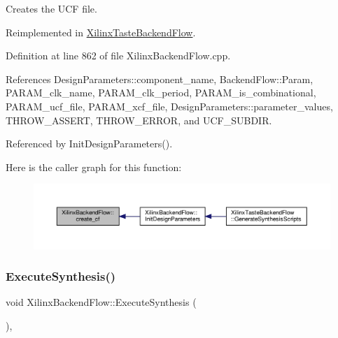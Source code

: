 Creates the U\+CF file. 



Reimplemented in \hyperlink{classXilinxTasteBackendFlow_a0672740f515c4ef8cefe95feeca8dc12}{Xilinx\+Taste\+Backend\+Flow}.



Definition at line 862 of file Xilinx\+Backend\+Flow.\+cpp.



References Design\+Parameters\+::component\+\_\+name, Backend\+Flow\+::\+Param, P\+A\+R\+A\+M\+\_\+clk\+\_\+name, P\+A\+R\+A\+M\+\_\+clk\+\_\+period, P\+A\+R\+A\+M\+\_\+is\+\_\+combinational, P\+A\+R\+A\+M\+\_\+ucf\+\_\+file, P\+A\+R\+A\+M\+\_\+xcf\+\_\+file, Design\+Parameters\+::parameter\+\_\+values, T\+H\+R\+O\+W\+\_\+\+A\+S\+S\+E\+RT, T\+H\+R\+O\+W\+\_\+\+E\+R\+R\+OR, and U\+C\+F\+\_\+\+S\+U\+B\+D\+IR.



Referenced by Init\+Design\+Parameters().

Here is the caller graph for this function\+:
\nopagebreak
\begin{figure}[H]
\begin{center}
\leavevmode
\includegraphics[width=350pt]{d6/d94/classXilinxBackendFlow_af8b92a68a04a001e2f4b43fd14dd21b7_icgraph}
\end{center}
\end{figure}
\mbox{\label{classXilinxBackendFlow_a006b64153e4e8498948c37522fc24b0f}} 
\subsubsection{\texorpdfstring{Execute\+Synthesis()}{ExecuteSynthesis()}}
{\footnotesize\ttfamily void Xilinx\+Backend\+Flow\+::\+Execute\+Synthesis (\begin{DoxyParamCaption}{ }\end{DoxyParamCaption})\hspace{0.3cm}{\ttfamily [override]}, {\ttfamily [virtual]}}



